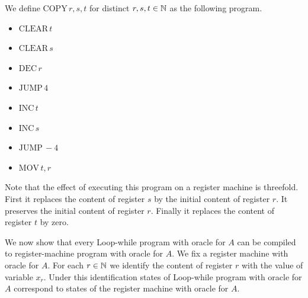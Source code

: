 \documentclass[10pt]{amsart}
\begin{document}
\begin{example}\label{example:copy_with_temp_program}
	We define $\mathrm{COPY}\,r,s,t$ for distinct $r,s,t\in {\mathbb N}$ as the following program.
	\begin{itemize}
		\item[] $\mathrm{CLEAR}\,t$
		\item[] $\mathrm{CLEAR}\,s$
		\item[] $\mathrm{DEC}\,r$
		\item[] $\mathrm{JUMP}\,4$
		\item[] $\mathrm{INC}\,t$
		\item[]	$\mathrm{INC}\,s$
		\item[] $\mathrm{JUMP}\,-4$
		\item[]	$\mathrm{MOV}\,t,r$
	\end{itemize}
	Note that the effect of executing this program on a register machine is threefold. First it replaces the content of register $s$ by the initial content of register $r$. It preserves the initial content of register $r$. Finally it replaces the content of register $t$ by zero.
\end{example}
\noindent
We now show that every Loop-while program with oracle for $A$ can be compiled to register-machine program with oracle for $A$. We fix a register machine with oracle for $A$. For each $r \in {\mathbb N}$ we identify the content of register $r$ with the value of variable $x_r$. Under this identification states of Loop-while program with oracle for $A$ correspond to states of the register machine with oracle for $A$.
\end{document}
